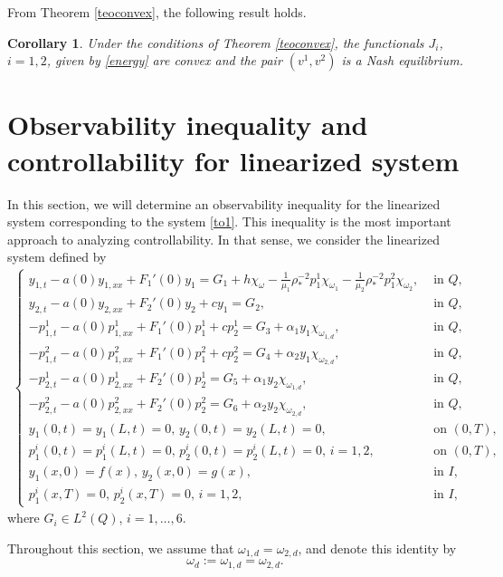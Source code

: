 \documentclass[11pt,a4paper]{amsart}
\numberwithin{equation}{section}
\newtheorem{corollary}{Corollary}[section]
\begin{document}
From Theorem \ref{teoconvex}, the following result holds.
\begin{corollary}
 Under the conditions of Theorem \ref{teoconvex},  the functionals $J_i$, $i = 1, 2$, given by \eqref{energy} are  convex and the pair $(v^1,v^2)$ is a Nash equilibrium. 
\end{corollary}


\section{ \bf Observability inequality and controllability for linearized system}

In this section, we will determine an observability inequality for the linearized system corresponding to the system \eqref{to1}. This inequality is the most important approach to analyzing controllability. In that sense, we consider the linearized system defined by 
\begin{align} \label{lin1}
	\begin{cases}
		y_{1,t}-a(0)y_{1,xx}+F_1'(0)y_1  = G_1+h\chi_\omega-\frac{1}{\mu_1}\rho_*^{-2}p_1^1\chi_{\omega_1}-\frac{1}{\mu_2}\rho_*^{-2}p_1^2\chi_{\omega_2}, &\text{ in } Q,\\
		y_{2,t}-a(0)y_{2,xx}+F_2'(0)y_2  +cy_1 = G_2, &\text{ in } Q,\\ 
		-p_{1,t}^1-a(0)p_{1,xx}^1+F_1'(0)p_1^1+cp_2^1=G_3+\alpha_1 y_1 \chi_{\omega_{1,d}}, &\text{ in } Q,\\
		-p_{1,t}^2-a(0)p_{1,xx}^2+F_1'(0)p_1^2+cp_2^2=G_4+\alpha_2 y_1\chi_{\omega_{2,d}},&\text{ in } Q,\\
		-p_{2,t}^1-a(0)p_{2,xx}^1+F_2'(0)p_2^1=G_5+\alpha_1 y_2\chi_{\omega_{1,d}}, &\text{ in } Q,\\
		-p_{2,t}^2-a(0)p_{2,xx}^2+F_2'(0)p_2^2=G_6+\alpha_2 y_2 \chi_{\omega_{2,d}}, &\text{ in } Q,\\
  		y_1(0,t) = y_1(L,t) =0,\,  y_2(0,t) = y_2(L,t) = 0, &\text{ on } (0,T),\\ 
		p_1^i(0,t) = p_1^i(L,t) =0,\,  p_2^i(0,t) = p_2^i(L,t) = 0, \, i=1,2,&\text{ on } (0,T),\\ 
		y_1(x,0) = f(x),\,  y_2(x,0) = g(x), &\text{ in } I,\\
		p_1^i(x,T) =0,\,  p_2^i(x,T) =0, \, i=1,2,&\text{ in } I,
	\end{cases}		
\end{align}where $G_i \in L^2(Q)$, $i = 1, \ldots, 6$.

Throughout this section, we assume that $\omega_{1,d}=\omega_{2,d}$,  and denote this identity by
\begin{equation}\label{ec9}	\omega_{d}:=\omega_{1,d}=\omega_{2,d}.
\end{equation}
\end{document}
